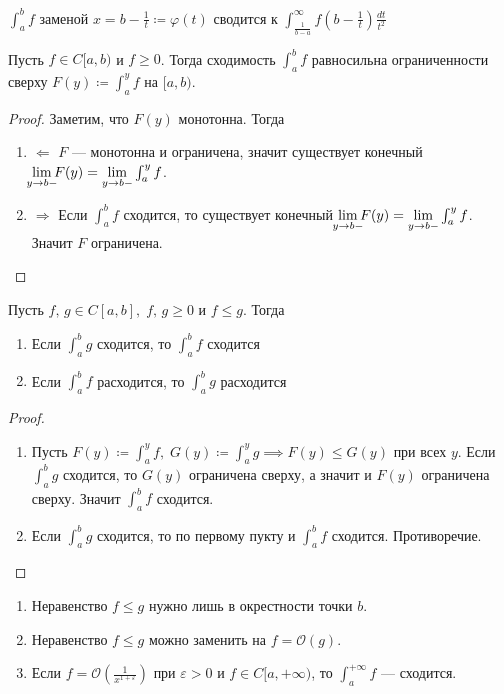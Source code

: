 \begin{notice}
  $\displaystyle \int_{a}^{b} f$ заменой $x = b - \frac{1}{t} \coloneqq \varphi(t)$ сводится к
  $\displaystyle \int_{\frac{1}{b - a}}^{\infty} f(b - \frac{1}{t})\frac{dt}{t^2}$
\end{notice}

\begin{theorem}
  Пусть $f \in C[a, b)$ и $f \geq 0$. Тогда сходимость $\int_{a}^{b} f$ равносильна ограниченности сверху $F(y) \coloneqq \int_{a}^{y} f$ на $[a, b)$.
\end{theorem}
\begin{proof}
  Заметим, что $F(y)$ монотонна. Тогда
  \begin{enumerate}
    \item[]$\boxed{\Leftarrow}$
    $F$ --- монотонна и ограничена, значит существует конечный $\lim\limits_{\mathclap{y \to b-}}F(y) = \lim\limits_{y \to b-}\int_{a}^{y} f$.
    \item[]$\boxed{\Rightarrow}$
    Если $\int_{a}^{b} f$ сходится, то существует конечный $\lim\limits_{\mathclap{y \to b-}} F(y) = \lim\limits_{y \to b-} \int_{a}^{y} f$. Значит $F$ ограничена.
  \end{enumerate}
\end{proof}

\begin{theorem}
Пусть $f,\, g \in C[a, b], \; f,\, g \geq 0$ и $f \leq g$. Тогда
\begin{enumerate}
    \item Если $\int_{a}^{b} g$ сходится, то $\int_{a}^{b} f$ сходится
    \item Если $\int_{a}^{b} f$ расходится, то $\int_{a}^{b} g$ расходится
\end{enumerate}
\end{theorem}
\begin{proof}
  \begin{enumerate}
    \item Пусть $F(y) \coloneqq \int_{a}^{y} f, \; G(y) \coloneqq \int_{a}^{y} g \implies F(y) \leq G(y)$ при всех $y$. Если $\int_{a}^{b} g$ сходится, то $G(y)$ ограничена сверху, а значит и $F(y)$ ограничена сверху. Значит $\int_{a}^{b} f$ сходится.
    \item Если $\int_{a}^{b} g$ сходится, то по первому пукту и $\int_{a}^{b} f$ сходится. Противоречие.
    \end{enumerate}
\end{proof}

\begin{notice}
  \begin{enumerate}
    \item Неравенство $f \leq g$ нужно лишь в окрестности точки $b$.
    \item Неравенство $f \leq g$ можно заменить на $f = \mathcal{O}(g)$.
    \item Если $f = \mathcal{O}(\frac{1}{x^{1 + \varepsilon}})$ при $\varepsilon > 0$ и $f \in C[a, +\infty)$, то $\int_{a}^{+\infty} f$ --- сходится.
  \end{enumerate}
\end{notice}

